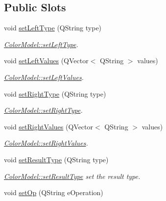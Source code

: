 \subsection*{Public Slots}
\begin{DoxyCompactItemize}
\item 
void \hyperlink{class_color_model_a747a1c9db1fb6f8eecf3a89adf5d5d37}{set\+Left\+Type} (Q\+String type)
\begin{DoxyCompactList}\small\item\em \hyperlink{class_color_model_a747a1c9db1fb6f8eecf3a89adf5d5d37}{Color\+Model\+::set\+Left\+Type}. \end{DoxyCompactList}\item 
void \hyperlink{class_color_model_a7954f6e500e4a2a7d9aa5813f5e288d5}{set\+Left\+Values} (Q\+Vector$<$ Q\+String $>$ values)
\begin{DoxyCompactList}\small\item\em \hyperlink{class_color_model_a7954f6e500e4a2a7d9aa5813f5e288d5}{Color\+Model\+::set\+Left\+Values}. \end{DoxyCompactList}\item 
void \hyperlink{class_color_model_acad4c21bc8bcede62c821f6e87a44e38}{set\+Right\+Type} (Q\+String type)
\begin{DoxyCompactList}\small\item\em \hyperlink{class_color_model_acad4c21bc8bcede62c821f6e87a44e38}{Color\+Model\+::set\+Right\+Type}. \end{DoxyCompactList}\item 
void \hyperlink{class_color_model_a07658db30b08f31f8f8190b6f4ed98d6}{set\+Right\+Values} (Q\+Vector$<$ Q\+String $>$ values)
\begin{DoxyCompactList}\small\item\em \hyperlink{class_color_model_a07658db30b08f31f8f8190b6f4ed98d6}{Color\+Model\+::set\+Right\+Values}. \end{DoxyCompactList}\item 
void \hyperlink{class_color_model_ae0c25592f1e201251a6090496548e762}{set\+Result\+Type} (Q\+String type)
\begin{DoxyCompactList}\small\item\em \hyperlink{class_color_model_ae0c25592f1e201251a6090496548e762}{Color\+Model\+::set\+Result\+Type} set the result type. \end{DoxyCompactList}\item 
void \hyperlink{class_color_model_ad51072410fbe8572066b3a53ca85a289}{set\+Op} (Q\+String e\+Operation)

\end{DoxyCompactItemize}

